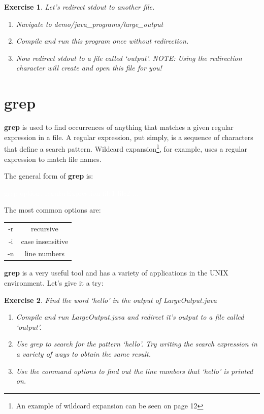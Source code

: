 \documentclass[oneside]{book}
\newcommand{\commandline}[1]{\begin{center} \colorbox{Dark}{\textcolor{white}{#1}} \end{center}}
\newtheorem{ex}{Exercise}[chapter]
\begin{document}
        \vspace{0.5cm}

    \begin{ex} Let's redirect stdout to another file.
        \begin{enumerate}
            \item Navigate to demo/java\_programs/large\_output
            \item Compile and run this program once without redirection.
            \item Now redirect stdout to a file called `output'. NOTE: Using the redirection character will create and open this file for you!
        \end{enumerate}
    \end{ex}

\section{grep}
\textbf{grep} is used to find occurrences of anything that matches a given regular expression in a file. A regular expression, put simply, is a sequence of characters that define a search pattern. Wildcard expansion\footnote{An example of wildcard expansion can be seen on page 12}, for example, uses a regular expression to match file names.

The general form of \textbf{grep} is:
    \commandline{grep options regularExpression file1 file2 ...}
    \vspace{0.15cm}
        The most common options are:
    \begin{center}
    \begin{tabular}{|c|c|}
        \hline
        -r & recursive \\
        -i & case insensitive \\
        -n & line numbers \\ 
        \hline
    \end{tabular}
    \end{center}
    \vspace{0.15cm}
    
    \textbf{grep} is a very useful tool and has a variety of applications in the UNIX environment. Let's give it a try:
    
    \vspace{0.3cm}
    \begin{ex} Find the word `hello' in the output of LargeOutput.java
        \begin{enumerate}
            \item Compile and run LargeOutput.java and redirect it's output to a file called `output'.
            \item Use grep to search for the pattern `hello'. Try writing the search expression in a variety of ways to obtain the same result.
            \item Use the command options to find out the line numbers that `hello' is printed on.
        \end{enumerate}
    \end{ex}
    
\end{document}

